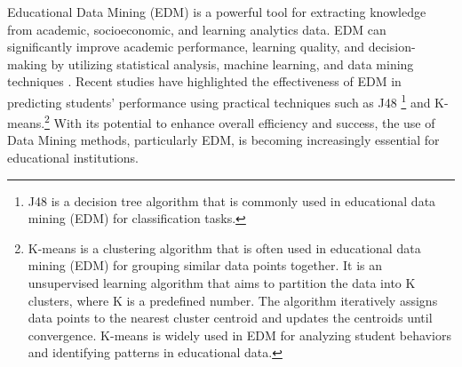 Educational Data Mining (EDM) is a powerful tool for extracting knowledge from academic, socioeconomic,
and learning analytics data. EDM can significantly improve academic performance, learning quality,
and decision-making by utilizing statistical analysis, machine learning, and data mining techniques \citep{hooda_integrating_2022, arifin_using_2022}.
Recent studies have highlighted the effectiveness of EDM in predicting students' performance using
practical techniques such as J48 \footnote{J48 is a decision tree algorithm that is commonly used in
	educational data mining (EDM) for classification tasks.} and K-means.\footnote{ K-means is a clustering algorithm that is often used in educational data mining
	(EDM) for grouping similar data points together. It is an unsupervised learning algorithm that aims to partition the data into K clusters, where K is a predefined number.
	The algorithm iteratively assigns data points to the nearest cluster centroid and updates the centroids until convergence.
	K-means is widely used in EDM for analyzing student behaviors and identifying patterns in educational data.}
With its potential to enhance overall efficiency and success\citep{prince_sattam_bin_abdulaziz_university_state_2016},
the use of Data Mining methods, particularly EDM, is becoming increasingly essential for educational institutions.


